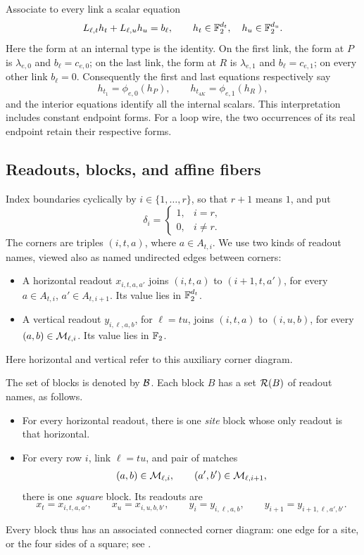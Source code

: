 Associate to every link a scalar equation
\begin{equation}
   L_{\ell,t}h_t+L_{\ell,u}h_u=b_\ell,
   \qquad h_t\in\mathbb F_2^{d_t},\quad h_u\in\mathbb F_2^{d_u}.
   \label{eq:link-equation}
\end{equation}
Here the form at an internal type is the identity. On the first link,
the form at \(P\) is \(\lambda_{e,0}\) and \(b_\ell=c_{e,0}\);
on the last link, the form at \(R\) is \(\lambda_{e,1}\) and
\(b_\ell=c_{e,1}\); on every other link \(b_\ell=0\).
Consequently the first and last equations respectively say
\[
 h_{t_1}=\phi_{e,0}(h_P),
 \qquad
 h_{t_{4K}}=\phi_{e,1}(h_R),
\]
and the interior equations identify all the internal scalars.
This interpretation includes constant endpoint forms. For a loop wire,
the two occurrences of its real endpoint retain their respective forms.

\subsection{Readouts, blocks, and affine fibers}
\label{offset:blocks}

Index boundaries cyclically by \(i\in\{1,\ldots,r\}\), so that \(r+1\)
means \(1\), and put
\[
 \delta_i=
 \begin{cases}
  1,&i=r,\\
  0,&i\ne r.
 \end{cases}
\]
The corners are triples \((i,t,a)\), where \(a\in A_{t,i}\).
We use two kinds of readout names, viewed also as named undirected edges
between corners:
\begin{itemize}
 \item A horizontal readout \(x_{i,t,a,a'}\) joins
 \((i,t,a)\) to \((i+1,t,a')\), for every
 \(a\in A_{t,i}\), \(a'\in A_{t,i+1}\). Its value lies in \(\mathbb F_2^{d_t}\).
 \item A vertical readout \(y_{i,\ell,a,b}\), for \(\ell=tu\), joins
 \((i,t,a)\) to \((i,u,b)\), for every
 \((a,b)\in\mathcal M_{\ell,i}\). Its value lies in \(\mathbb F_2\).
\end{itemize}
Here horizontal and vertical refer to this auxiliary corner diagram.

The set of blocks is denoted by \(\mathcal B\). Each block \(B\) has a set
\(\mathcal R(B)\) of readout names, as follows.
\begin{itemize}
 \item For every horizontal readout, there is one \emph{site} block whose
 only readout is that horizontal.
 \item For every row \(i\), link \(\ell=tu\), and pair of matches
 \[
   (a,b)\in\mathcal M_{\ell,i},\qquad
   (a',b')\in\mathcal M_{\ell,i+1},
 \]
 there is one \emph{square} block. Its readouts are
 \[
  x_t=x_{i,t,a,a'},\qquad x_u=x_{i,u,b,b'},\qquad
  y_i=y_{i,\ell,a,b},\qquad
  y_{i+1}=y_{i+1,\ell,a',b'}.
 \]
\end{itemize}
Every block thus has an associated connected corner diagram: one edge for
a site, or the four sides of a square; see .

